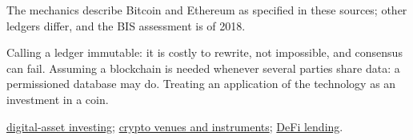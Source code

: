 \begin{qfdefinition}
 The mechanics describe Bitcoin and Ethereum as specified in these sources; other ledgers differ, and the BIS assessment is of 2018.

 Calling a ledger immutable: it is costly to rewrite, not impossible, and consensus can fail. Assuming a blockchain is needed whenever several parties share data: a permissioned database may do. Treating an application of the technology as an investment in a coin.

 \hyperref[meth:digital-asset-investment-analysis]{digital-asset investing}; \hyperref[def:crypto-venue-instrument-structure]{crypto venues and instruments}; \hyperref[mech:defi-lending-liquidation]{DeFi lending}.

\end{qfdefinition}


